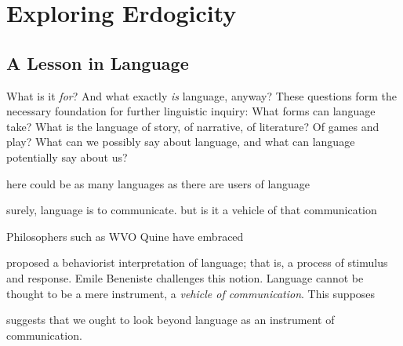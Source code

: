 \documentclass[10pt,twoside,twocolumn,openany,nomultitoc]{book}
\begin{document}


\chapter{Exploring Erdogicity} 
\section{A Lesson in Language}\vspace{2pt}
      What is it \textit{for}?
     And what exactly \textit{is} language, anyway? These questions form the necessary foundation for further linguistic inquiry: What forms can language take? What is the language of story, of narrative, of literature? Of games and play? What can we possibly say about language, and what can language potentially say about us?

    here could be as many languages as there are users of language
    
     surely, language is to communicate. but is it a vehicle of that communication
     
     
     Philosophers such as WVO Quine have embraced
     
      proposed a behaviorist interpretation of language; that is, a process of stimulus and response. Emile Beneniste challenges this notion. Language cannot be thought to be a mere instrument, a \textit{vehicle of communication}\cite{}. This supposes 
     
     suggests that we ought to look beyond language as an instrument of communication.   
\end{document}

